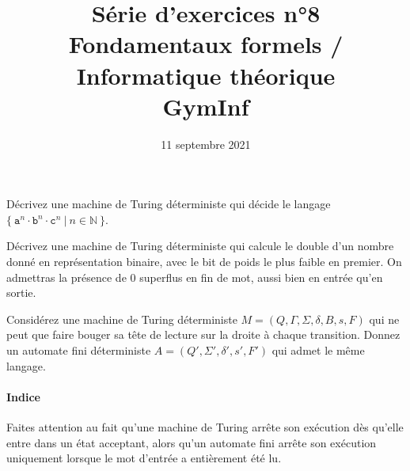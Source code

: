 \documentclass[12pt,french,a4paper]{article}
\begin{document}
\title{\vspace{-2cm}Série d'exercices n°8\\\large{Fondamentaux formels / Informatique théorique\\GymInf}}
\date{\vspace{-1cm}11 septembre 2021}

\maketitle

\begin{question}
Décrivez une machine de Turing déterministe qui décide le langage $\{\ \texttt{a}^n \cdot \texttt{b}^n \cdot \texttt{c}^n\ |\ n \in \mathbb{N}\ \}$.
\end{question}

\vspace{1cm}

\begin{question}
Décrivez une machine de Turing déterministe qui calcule le double d'un nombre donné en représentation binaire, avec le bit de poids le plus faible en premier. On admettras la présence de $0$ superflus en fin de mot, aussi bien en entrée qu'en sortie.
\end{question}

\vspace{1cm}

\begin{question}
Considérez une machine de Turing déterministe $M = (Q, \Gamma, \Sigma, \delta, B, s, F)$ qui ne peut que faire bouger sa tête de lecture sur la droite à chaque transition. Donnez un automate fini déterministe $A = (Q', \Sigma', \delta', s', F')$ qui admet le même langage.

\paragraph{Indice} Faites attention au fait qu'une machine de Turing arrête son exécution dès qu'elle entre dans un état acceptant, alors qu'un automate fini arrête son exécution uniquement lorsque le mot d'entrée a entièrement été lu.
\end{question}

\vspace{1cm}
\end{document}
